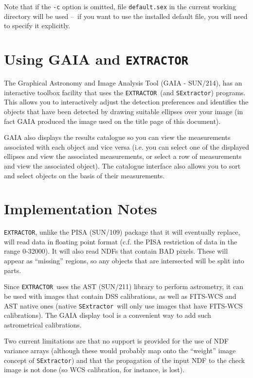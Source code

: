 \documentclass[twoside,11pt]{article}
\newcommand{\xref}[3]{#1}
\newcommand{\xlabel}[1]{}
\renewcommand{\_}{\texttt{\symbol{95}}}
\newcommand{\EXTRACTOR}{\texttt{EXTRACTOR}}
\newcommand{\SExtractor}{\texttt{SExtractor}}
\newcommand{\dash}{--}
\newcommand{\dash}{-}
\begin{document}
Note that if the \texttt{-c} option is omitted, file \texttt{default.sex} in the
current working directory will be used \dash\ if you want to use the installed
default file, you will need to specify it explicitly.

\section{\xlabel{using_gaia_and_extractor}Using GAIA and \EXTRACTOR}
The Graphical Astronomy and Image Analysis Tool (GAIA -
\xref{SUN/214}{sun214}{}), has an interactive toolbox facility that
uses the \EXTRACTOR\ (and \SExtractor) programs. This allows you to
interactively adjust the detection preferences and identifies the
objects that have been detected by drawing suitable ellipses over your
image (in fact GAIA produced the image used on the title page of this
document).

GAIA also displays the results catalogue so you can view the
measurements associated with each object and vice versa (i.e. you can
select one of the displayed ellipses and view the associated
measurements, or select a row of measurements and view the associated
object). The catalogue interface also allows you to sort and select
objects on the basis of their measurements.

\section{\label{implementation_notes}\xlabel{implementation_notes}Implementation Notes}

\EXTRACTOR, unlike the PISA (\xref{SUN/109}{sun109}{}) package that it
will eventually replace, will read data in floating point format
(c.f. the PISA restriction of data in the range 0-32000).  It will
also read NDFs that contain BAD pixels. These will appear as
``missing'' regions, so any objects that are intersected will be split
into parts.

Since \EXTRACTOR\ uses the AST (\xref{SUN/211}{sun211}{}) library to
perform astrometry, it can be used with images that contain DSS
calibrations, as well as FITS-WCS and AST native ones (native
\SExtractor\ will only use images that have FITS-WCS
calibrations). The GAIA display tool is a convenient way to add such
astrometrical calibrations.

Two current limitations are that no support is provided for the use of
NDF variance arrays (although these would probably map onto the
``weight'' image concept of \SExtractor) and that the propagation of
the input NDF to the check image is not done (so WCS calibration, for
instance, is lost).
\end{document}
